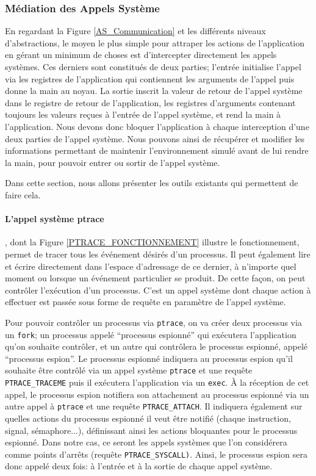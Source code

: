 \subsubsection{Médiation des Appels Système}

En regardant la Figure \ref{AS_Communication} et les différents niveaux
d'abstractions, le moyen le plus simple pour attraper les actions de
l'application en gérant un minimum de choses est d'intercepter directement les
appels systèmes.  Ces derniers sont constitués de deux parties; l'entrée
initialise l'appel via les registres de l'application qui contiennent les
arguments de l'appel puis donne la main au noyau. La sortie inscrit la valeur de
retour de l'appel système dans le registre de retour de l'application, les
registres d'arguments contenant toujours les valeurs reçues à l'entrée de
l'appel système, et rend la main à l'application. Nous devons donc bloquer
l'application à chaque interception d'une deux parties de l'appel système. Nous
pouvons ainsi de récupérer et modifier les informations permettant de maintenir
l'environnement simulé avant de lui rendre la main, pour pouvoir entrer ou
sortir de l'appel système.

 Dans cette section, nous allons présenter les outils existants qui permettent
 de faire cela.
 
 \paragraph{L'appel système ptrace}\citep{AS:Interception, MARION:Interception}
 , dont la Figure \ref{PTRACE_FONCTIONNEMENT} illustre le fonctionnement, permet
 de tracer tous les événement désirés d'un processus. Il peut également lire et
 écrire directement dans l'espace d'adressage de ce dernier, à n'importe quel
 moment ou lorsque un événement particulier se produit. De cette façon, on peut
 contrôler l'exécution d'un processus. C'est un appel système dont chaque action
 à effectuer est passée sous forme de requête en paramètre de l'appel système.

Pour pouvoir contrôler un processus via \texttt{ptrace}, on va créer deux
processus via un \texttt{fork}; un processus appelé ``processus espionné'' qui
exécutera l'application qu'on souhaite contrôler, et un autre qui contrôlera le
processus espionné, appelé ``processus espion''. Le processus espionné indiquera
au processus espion qu'il souhaite être contrôlé via un appel
système \texttt{ptrace} et une requête \texttt{PTRACE\_TRACEME} puis il
exécutera l'application via un \texttt{exec}. À la réception de cet appel, le
processus espion notifiera son attachement au processus espionné via un autre
appel à \texttt{ptrace} et une requête \texttt{PTRACE\_ATTACH}. Il indiquera
également sur quelles actions du processus espionné il veut être notifié (chaque
instruction, signal, sémaphore...), définissant ainsi les actions bloquantes
pour le processus espionné. Dans notre cas, ce seront les appels systèmes que
l'on considérera comme points d'arrêts (requête
\texttt{PTRACE\_SYSCALL)}. Ainsi, le processus espion sera donc appelé deux
fois: à l'entrée et à la sortie de chaque appel système.

